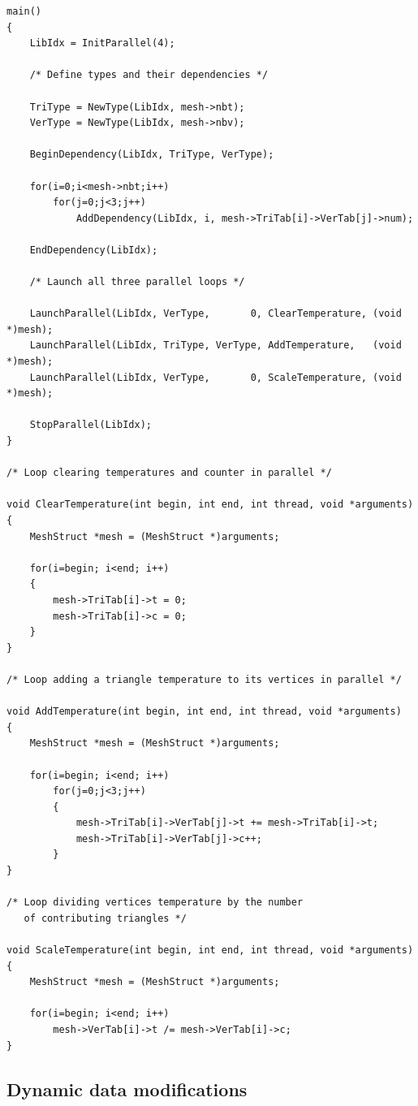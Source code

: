 \documentclass[a4paper,12pt]{article}
\begin{document}
\begin{tt}
\begin{verbatim}
main()
{
    LibIdx = InitParallel(4);

    /* Define types and their dependencies */

    TriType = NewType(LibIdx, mesh->nbt);
    VerType = NewType(LibIdx, mesh->nbv);

    BeginDependency(LibIdx, TriType, VerType);

    for(i=0;i<mesh->nbt;i++)
        for(j=0;j<3;j++)
            AddDependency(LibIdx, i, mesh->TriTab[i]->VerTab[j]->num);

    EndDependency(LibIdx);

    /* Launch all three parallel loops */

    LaunchParallel(LibIdx, VerType,       0, ClearTemperature, (void *)mesh);
    LaunchParallel(LibIdx, TriType, VerType, AddTemperature,   (void *)mesh);
    LaunchParallel(LibIdx, VerType,       0, ScaleTemperature, (void *)mesh);

    StopParallel(LibIdx);
}

/* Loop clearing temperatures and counter in parallel */

void ClearTemperature(int begin, int end, int thread, void *arguments)
{
    MeshStruct *mesh = (MeshStruct *)arguments;

    for(i=begin; i<end; i++)
    {
        mesh->TriTab[i]->t = 0;
        mesh->TriTab[i]->c = 0;
    }
}

/* Loop adding a triangle temperature to its vertices in parallel */

void AddTemperature(int begin, int end, int thread, void *arguments)
{
    MeshStruct *mesh = (MeshStruct *)arguments;

    for(i=begin; i<end; i++)
        for(j=0;j<3;j++)
        {
            mesh->TriTab[i]->VerTab[j]->t += mesh->TriTab[i]->t;
            mesh->TriTab[i]->VerTab[j]->c++;
        }
}

/* Loop dividing vertices temperature by the number
   of contributing triangles */

void ScaleTemperature(int begin, int end, int thread, void *arguments)
{
    MeshStruct *mesh = (MeshStruct *)arguments;

    for(i=begin; i<end; i++)
        mesh->VerTab[i]->t /= mesh->VerTab[i]->c;
}
\end{verbatim}
\end{tt}
\normalfont


\subsection{Dynamic data modifications}
\end{document}
